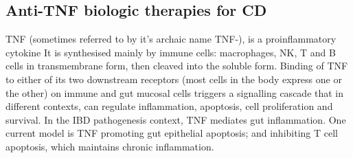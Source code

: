 \begin{outline}
\subsection{Anti-TNF biologic therapies for CD}

\1 \gls{TNF} (sometimes referred to by it's archaic name \gls{TNF}-\textalpha), is a proinflammatory cytokine
    \2 It is synthesised mainly by immune cells: macrophages, NK, T and B cells in transmembrane form, then cleaved into the soluble form.
    \2 Binding of \gls{TNF} to either of its two downstream receptors (most cells in the body express one or the other) on immune and gut mucosal cells triggers a signalling cascade that in different contexts, can regulate inflammation, apoptosis, cell proliferation and survival. \autocite{aggarwal2003SignallingPathwaysTNF,kalliolias2016TNFBiologyPathogenic,digby-bell2019InterrogatingHostImmunity}
    \2 In the IBD pathogenesis context, TNF mediates gut inflammation. One current model is TNF promoting gut epithelial apoptosis; and inhibiting T cell apoptosis, which maintains chronic inflammation. \autocite{levin2016MechanismActionAntiTNF,adegbola2018AntiTNFTherapyCrohn,digby-bell2019InterrogatingHostImmunity}


\end{outline}
